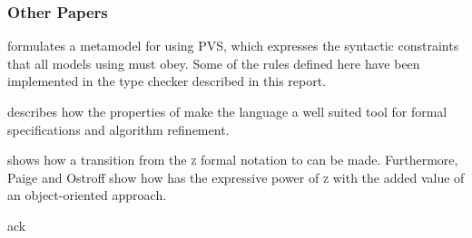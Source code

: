 \subsubsection{Other Papers}
\cite{ostroff2001} formulates a metamodel for \bon{} using PVS, which expresses the syntactic constraints that all models using \bon{} must obey. Some of the rules defined here have been implemented in the type checker described in this report.

\cite{ostroff1999} describes how the properties of \bon{} make the language a well suited tool for formal specifications and algorithm refinement.

\cite{ostroff1998} shows how a transition from the \textsc{z} formal notation to \bon{} can be made. Furthermore, Paige and Ostroff show how \bon{} has the expressive power of \textsc{z} with the added value of an object-oriented approach.

{ack}
